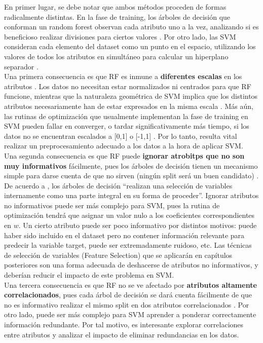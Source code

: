 En primer lugar, se debe notar que ambos métodos proceden de formas radicalmente distintas. En la fase de training, los árboles de decisión que conforman un random forest observan cada atributo uno a la vez, analizando si es beneficioso realizar divisiones para ciertos valores \cite{mitchell}. Por otro lado, las SVM consideran cada elemento del dataset como un punto en el espacio, utilizando los valores de todos los atributos en simultáneo para calcular un hiperplano separador \cite{svm2}. \\

Una primera consecuencia es que RF es inmune a \textbf{diferentes escalas} en los atributos \cite{statisticallearning}. Los datos no necesitan estar normalizados ni centrados para que RF funcione, mientras que la naturaleza geométrica de SVM implica que los distintos atributos necesariamente han de estar expresados en la misma escala \cite{svm_practical}. Más aún, las rutinas de optimización que usualmente implementan la fase de training en SVM pueden fallar en converger, o tardar significativamente más tiempo, si los datos no se encuentran escalados a [0,1] o [-1,1]
\cite{svm_practical}. Por lo tanto, resulta vital realizar un preprocesamiento adecuado a los datos a la hora de aplicar SVM. \\ 

Una segunda consecuencia es que RF puede \textbf{ignorar atrobitps que no son muy informativos} fácilmente, pues los árboles de decisión tienen un mecanismo simple para darse cuenta de que no sirven (ningún split será un buen candidato) \cite{statisticallearning}. De acuerdo a \cite{statisticallearning}, los árboles de decisión ``realizan una selección de variables internamente como una parte integral en su forma de proceder''. Ignorar atributos no informativos puede ser más complejo para SVM, pues la rutina de optimización tendrá que asignar un valor nulo a los coeficientes correspondientes en $w$. Un cierto atributo puede ser poco informativo por distintos motivos: puede haber sido incluido en el dataset pero no contener información relevante para predecir la variable target, puede ser extremadamente ruidoso, etc.  Las técnicas de selección de variables  (Feature Selection) que se aplicarán en capítulos posteriores son una forma adecuada de deshacerse de atributos no informativos, y deberían reducir el impacto de este problema en SVM. \\

Una tercera consecuencia es que RF no se ve afectado por \textbf{atributos altamente correlacionados}, pues cada árbol de decisión se dará cuenta fácilmente de que no es informativo realizar el mismo split en dos atributos correlacionados \cite{rf_collinearity}. Por otro lado, puede ser más complejo para SVM aprender a ponderar correctamente información redundante. Por tal motivo, es interesante explorar correlaciones entre atributos y analizar el impacto de eliminar redundancias en los datos. \\

